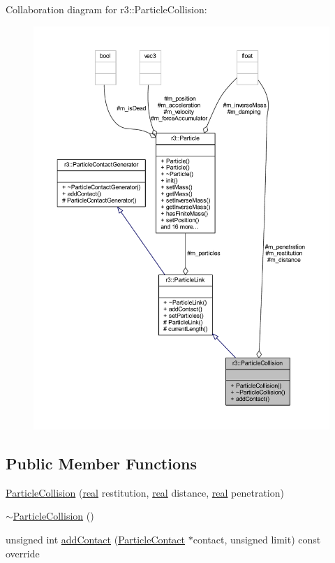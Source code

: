 Collaboration diagram for r3\+:\+:Particle\+Collision\+:\nopagebreak
\begin{figure}[H]
\begin{center}
\leavevmode
\includegraphics[width=350pt]{classr3_1_1_particle_collision__coll__graph}
\end{center}
\end{figure}
\subsection*{Public Member Functions}
\begin{DoxyCompactItemize}
\item 
\mbox{\hyperlink{classr3_1_1_particle_collision_af3c52ed10e7495207bf20f3263175098}{Particle\+Collision}} (\mbox{\hyperlink{namespacer3_ab2016b3e3f743fb735afce242f0dc1eb}{real}} restitution, \mbox{\hyperlink{namespacer3_ab2016b3e3f743fb735afce242f0dc1eb}{real}} distance, \mbox{\hyperlink{namespacer3_ab2016b3e3f743fb735afce242f0dc1eb}{real}} penetration)
\item 
\mbox{\hyperlink{classr3_1_1_particle_collision_a7227b004e41a96aafd5f9a54e3b6b97e}{$\sim$\+Particle\+Collision}} ()
\item 
unsigned int \mbox{\hyperlink{classr3_1_1_particle_collision_ab22f6b1c2d95c925c2dd5241be9b8889}{add\+Contact}} (\mbox{\hyperlink{classr3_1_1_particle_contact}{Particle\+Contact}} $\ast$contact, unsigned limit) const override
\end{DoxyCompactItemize}
